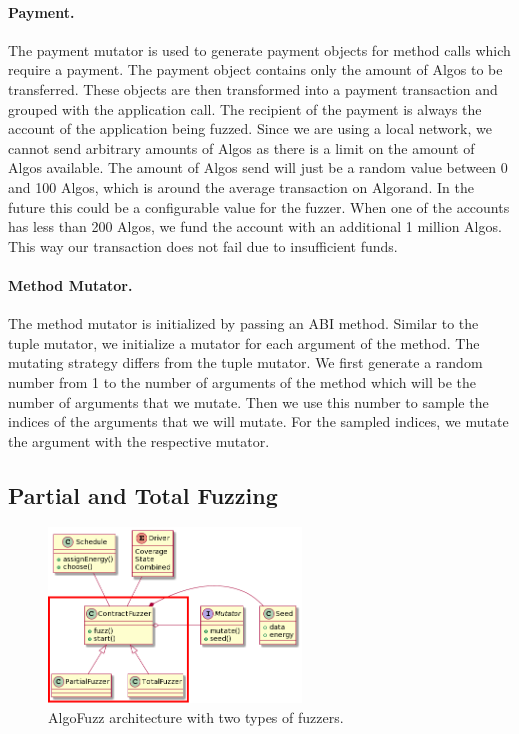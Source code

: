 \paragraph{Payment.}
The payment mutator is used to generate payment objects for method calls which require a payment.
The payment object contains only the amount of Algos to be transferred.
These objects are then transformed into a payment transaction and grouped with the application call.
The recipient of the payment is always the account of the application being fuzzed.
Since we are using a local network, we cannot send arbitrary amounts of Algos as there is a limit on the amount of Algos available.
The amount of Algos send will just be a random value between 0 and 100 Algos, which is around the average transaction on Algorand.
In the future this could be a configurable value for the fuzzer.
When one of the accounts has less than 200 Algos, we fund the account with an additional 1 million Algos.
This way our transaction does not fail due to insufficient funds.


\paragraph{Method Mutator.}
The method mutator is initialized by passing an \ac{ABI} method.
Similar to the tuple mutator, we initialize a mutator for each argument of the method.
The mutating strategy differs from the tuple mutator.
We first generate a random number from 1 to the number of arguments of the method which will be the number of arguments that we mutate.
Then we use this number to sample the indices of the arguments that we will mutate.
For the sampled indices, we mutate the argument with the respective mutator.


\subsection*{Partial and Total Fuzzing}


\begin{figure}[htbp]
    \centering
    \includegraphics[width=0.6\textwidth]{figures/architecture-fuzzer-square.png}
    \caption{AlgoFuzz architecture with two types of fuzzers.}\label{fig:architecture-fuzzers}
\end{figure}



